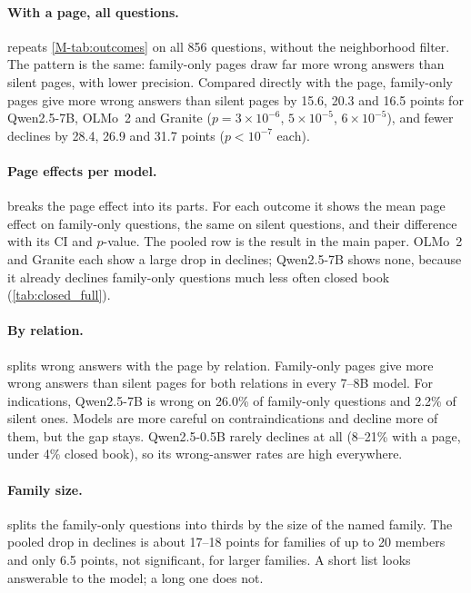 

\paragraph{With a page, all questions.}
 repeats \cref{M-tab:outcomes} on all 856 questions, without the neighborhood filter. The pattern is the same: family-only pages draw far more wrong answers than silent pages, with lower precision. Compared directly with the page, family-only pages give more wrong answers than silent pages by 15.6, 20.3 and 16.5 points for Qwen2.5-7B, OLMo~2 and Granite ($p=3\times10^{-6}$, $5\times10^{-5}$, $6\times10^{-5}$), and fewer declines by 28.4, 26.9 and 31.7 points ($p<10^{-7}$ each).



\paragraph{Page effects per model.}
 breaks the page effect into its parts. For each outcome it shows the mean page effect on family-only questions, the same on silent questions, and their difference with its CI and $p$-value. The pooled row is the result in the main paper. OLMo~2 and Granite each show a large drop in declines; Qwen2.5-7B shows none, because it already declines family-only questions much less often closed book (\cref{tab:closed_full}).



\paragraph{By relation.}
 splits wrong answers with the page by relation. Family-only pages give more wrong answers than silent pages for both relations in every 7--8B model. For indications, Qwen2.5-7B is wrong on 26.0\% of family-only questions and 2.2\% of silent ones. Models are more careful on contraindications and decline more of them, but the gap stays. Qwen2.5-0.5B rarely declines at all (8--21\% with a page, under 4\% closed book), so its wrong-answer rates are high everywhere.



\paragraph{Family size.}
 splits the family-only questions into thirds by the size of the named family. The pooled drop in declines is about 17--18 points for families of up to 20 members and only 6.5 points, not significant, for larger families. A short list looks answerable to the model; a long one does not.

